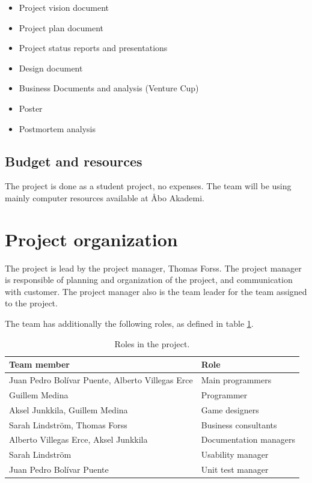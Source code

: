 \documentclass[12pt,a4paper]{article}
\begin{document}
\begin{itemize}
\item Project vision document
\item Project plan document
\item Project status reports and presentations
\item Design document
\item Business Documents and analysis (Venture Cup)
\item Poster
\item Postmortem analysis
\end{itemize}

\subsection{Budget and resources}

The project is done as a student project, no expenses. The team will
be using mainly computer resources available at Åbo Akademi.


\section{Project organization}

The project is lead by the project manager, Thomas Forss. The project
manager is responsible of planning and organization of the project,
and communication with customer. The project manager also is the team
leader for the team assigned to the project.

The team has additionally the following roles, as defined in table
\ref{tab:roles}.

\begin{table}[h!]
\small
\begin{tabular}{l|l}
Team member                                      &Role \\\hline\hline
Juan Pedro Bolívar Puente, Alberto Villegas Erce &Main programmers\\
Guillem Medina 					 &Programmer\\
Aksel Junkkila, Guillem Medina			 &Game designers\\		
Sarah Lindström, Thomas Forss			 &Business consultants\\
Alberto Villegas Erce, Aksel Junkkila		 &Documentation managers\\
Sarah Lindström					 &Usability manager\\
Juan Pedro Bolívar Puente			 &Unit test manager\\
\end{tabular}
\caption{Roles in the project.}
\label{tab:roles}
\end{table}
\end{document}
